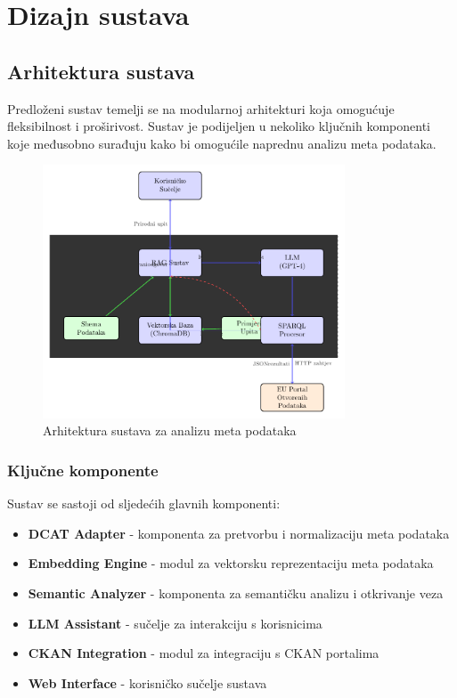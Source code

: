\chapter{Dizajn sustava}
\label{ch:system_design}


\section{Arhitektura sustava}
\label{sec:architecture}

Predloženi sustav temelji se na modularnoj arhitekturi koja omogućuje fleksibilnost i 
proširivost. Sustav je podijeljen u nekoliko ključnih komponenti koje međusobno 
surađuju kako bi omogućile naprednu analizu meta podataka.

\begin{figure}[h]
    \centering
    \includegraphics[width=0.8\textwidth]{figures/system_architecture}
    \caption{Arhitektura sustava za analizu meta podataka}
    \label{fig:system_architecture}
\end{figure}

\subsection{Ključne komponente}
Sustav se sastoji od sljedećih glavnih komponenti:

\begin{itemize}
    \item \textbf{DCAT Adapter} - komponenta za pretvorbu i normalizaciju meta podataka
    \item \textbf{Embedding Engine} - modul za vektorsku reprezentaciju meta podataka
    \item \textbf{Semantic Analyzer} - komponenta za semantičku analizu i otkrivanje veza
    \item \textbf{LLM Assistant} - sučelje za interakciju s korisnicima
    \item \textbf{CKAN Integration} - modul za integraciju s CKAN portalima
    \item \textbf{Web Interface} - korisničko sučelje sustava
\end{itemize}

